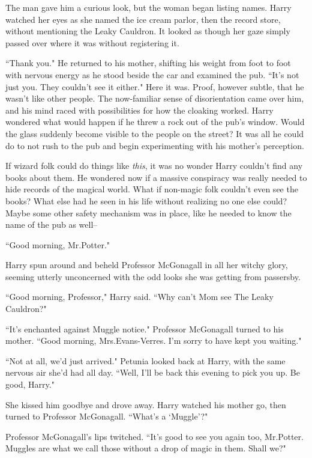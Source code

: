The man gave him a curious look, but the woman began listing names. Harry watched her eyes as she named the ice cream parlor, then the record store, without mentioning the Leaky Cauldron. It looked as though her gaze simply passed over where it was without registering it.

``Thank you." He returned to his mother, shifting his weight from foot to foot with nervous energy as he stood beside the car and examined the pub. ``It's not just you. They couldn't see it either." Here it was. Proof, however subtle, that he wasn't like other people. The now-familiar sense of disorientation came over him, and his mind raced with possibilities for how the cloaking worked. Harry wondered what would happen if he threw a rock out of the pub's window. Would the glass suddenly become visible to the people on the street? It was all he could do to not rush to the pub and begin experimenting with his mother's perception.

If wizard folk could do things like \emph{this}, it was no wonder Harry couldn't find any books about them. He wondered now if a massive conspiracy was really needed to hide records of the magical world. What if non-magic folk couldn't even see the books? What else had he seen in his life without realizing no one else could? Maybe some other safety mechanism was in place, like he needed to know the name of the pub as well\---

``Good morning, Mr.\?Potter."

Harry spun around and beheld Professor McGonagall in all her witchy glory, seeming utterly unconcerned with the odd looks she was getting from passersby.

``Good morning, Professor," Harry said. ``Why can't Mom see The Leaky Cauldron?"

``It's enchanted against Muggle notice." Professor McGonagall turned to his mother. ``Good morning, Mrs.\?Evans-Verres. I'm sorry to have kept you waiting."

``Not at all, we'd just arrived." Petunia looked back at Harry, with the same nervous air she'd had all day. ``Well, I'll be back this evening to pick you up. Be good, Harry."

She kissed him goodbye and drove away. Harry watched his mother go, then turned to Professor McGonagall. ``What's a `Muggle'?"

Professor McGonagall's lips twitched. ``It's good to see you again too, Mr.\?Potter. Muggles are what we call those without a drop of magic in them. Shall we?"

